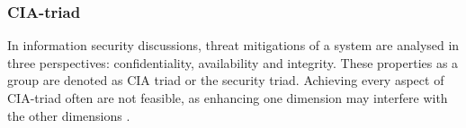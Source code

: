 \subsubsection{CIA-triad}
In information security discussions, threat mitigations of a system are analysed in three perspectives: confidentiality, availability and integrity. These properties as a group are denoted as CIA triad or the security triad.
Achieving every aspect of CIA-triad often are not feasible, as enhancing one dimension may interfere with the other dimensions \cite{securityincomputing}.
